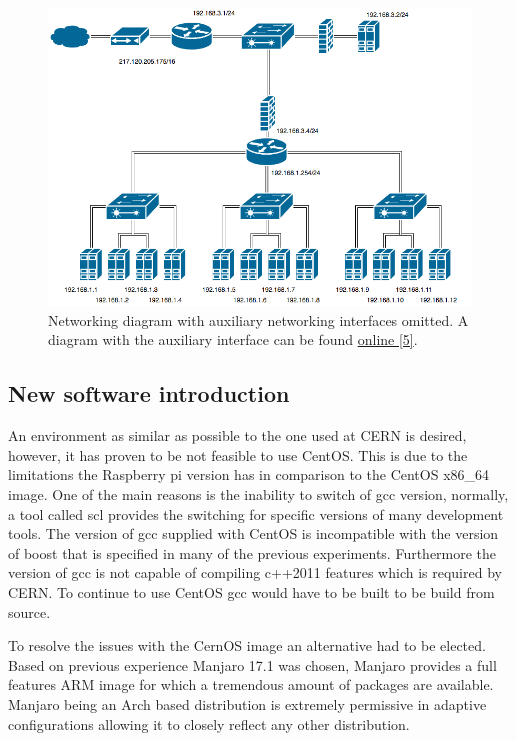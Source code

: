 \documentclass[]{article}
\begin{document}
\begin{center}
	\begin{figure}[H]
		\includegraphics[width=\textwidth]{network-primary}
		\caption{Networking diagram with auxiliary networking interfaces omitted. A diagram with the auxiliary interface can be found \hyperref[sec:ref05]{online [5]}.}
		\label{fig:ssh}
	\end{figure}
\end{center}


\subsection{New software introduction}
An environment as similar as possible to the one used at CERN is desired, however, it has proven to be not feasible to use CentOS. This is due to the limitations the Raspberry pi version has in comparison to the CentOS x86\_64 image. One of the main reasons is the inability to switch of gcc version, normally, a tool called scl provides the switching for specific versions of many development tools. The version of gcc supplied with CentOS is incompatible with the version of boost that is specified in many of the previous experiments. Furthermore the version of gcc is not capable of compiling c++2011 features which is required by CERN. To continue to use CentOS gcc would have to be built to be build from source.

To resolve the issues with the CernOS image an alternative had to be elected. Based on previous experience Manjaro 17.1 was chosen, Manjaro provides a full features ARM image for which a tremendous amount of packages are available. Manjaro being an Arch based distribution is extremely permissive in adaptive configurations allowing it to closely reflect any other distribution.
\end{document}

